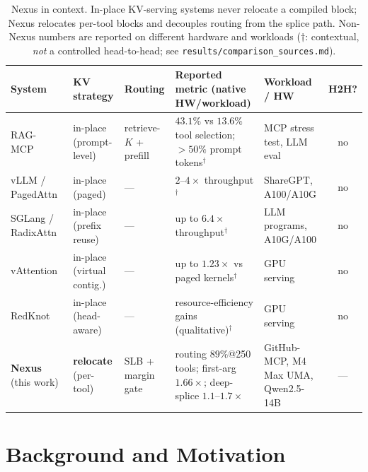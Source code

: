 \documentclass[10pt,conference]{IEEEtran}
\newcommand{\code}[1]{\texttt{\small #1}}
\begin{document}
\begin{table}[t]
\centering
\caption{Nexus in context. In-place KV-serving systems never relocate a compiled block; Nexus
relocates per-tool blocks and decouples routing from the splice path. Non-Nexus numbers are
reported on different hardware and workloads ($\dagger$: contextual, \emph{not} a controlled
head-to-head; see \code{results/comparison\_sources.md}).}
\label{tab:comparison}
\scriptsize
\begin{tabular}{@{}l l l p{4.5cm} p{3.3cm} c@{}}
\toprule
System & KV strategy & Routing & Reported metric (native HW/workload) & Workload / HW & H2H? \\
\midrule
RAG-MCP~\cite{ragmcp2025}                  & in-place (prompt-level)      & retrieve-$K$ + prefill & $43.1\%$ vs $13.6\%$ tool selection; ${>}50\%$ prompt tokens$^\dagger$ & MCP stress test, LLM eval & no \\
vLLM / PagedAttn~\cite{kwon2023vllm}       & in-place (paged)             & ---                    & $2\text{--}4\times$ throughput$^\dagger$                   & ShareGPT, A100/A10G       & no \\
SGLang / RadixAttn~\cite{zheng2024sglang}  & in-place (prefix reuse)      & ---                    & up to $6.4\times$ throughput$^\dagger$                     & LLM programs, A10G/A100   & no \\
vAttention~\cite{vattention2025}           & in-place (virtual contig.)   & ---                    & up to $1.23\times$ vs paged kernels$^\dagger$              & GPU serving               & no \\
RedKnot~\cite{redknot2026}                 & in-place (head-aware)        & ---                    & resource-efficiency gains (qualitative)$^\dagger$          & GPU serving               & no \\
\midrule
\textbf{Nexus} (this work)                 & \textbf{relocate} (per-tool) & SLB + margin gate      & routing $89\%$@250 tools; first-arg $1.66\times$; deep-splice $1.1\text{--}1.7\times$ & GitHub-MCP, M4 Max UMA, Qwen2.5-14B & --- \\
\bottomrule
\end{tabular}
\end{table}

\section{Background and Motivation}
\end{document}
